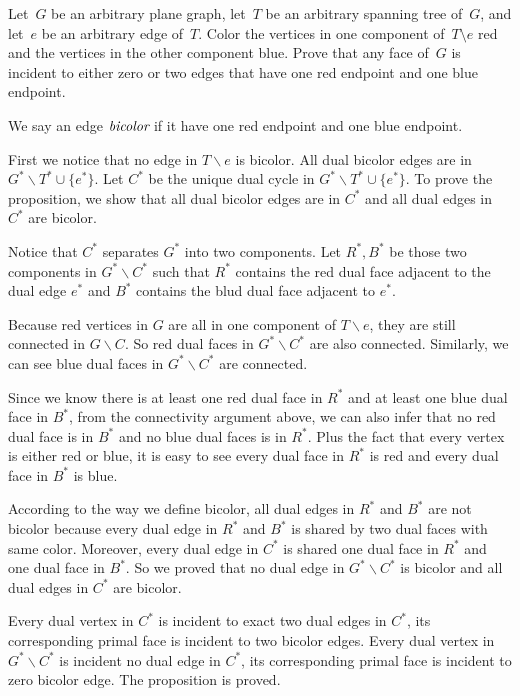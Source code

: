 \documentclass[11pt]{article}
\begin{document}
Let~\(G\) be an arbitrary plane graph, let~\(T\) be an arbitrary spanning tree of~\(G\), and
let~\(e\) be an arbitrary edge of~\(T\).
Color the vertices in one component of~\(T \setminus e\) red and the vertices in the other
component blue.
Prove that any face of~\(G\) is incident to either zero or two edges that have one red endpoint
and one blue endpoint.

\begin{solution}
  We say an edge \(\emph{bicolor}\) if it have one red endpoint and one blue endpoint.

  First we notice that no edge in \(T\backslash e\) is bicolor. All dual bicolor edges are in \(G^*\backslash T^* \cup \{e^*\}\).
  Let \(C^*\) be the unique dual cycle in \(G^*\backslash T^* \cup \{e^*\}\).
  To prove the proposition, we show that all dual bicolor edges are in \(C^*\) and all dual edges in \(C^*\) are bicolor.

  Notice that \(C^*\) separates \(G^*\) into two components.
  Let \(R^*,B^*\) be those two components in \(G^*\backslash C^*\) such that \(R^*\) contains the red dual face adjacent to the dual edge \(e^*\) and \(B^*\) contains the blud dual face adjacent to \(e^*\).

  Because red vertices in \(G\) are all in one component of \(T\backslash e\), they are still connected in \(G\backslash C\).
  So red dual faces in \(G^*\backslash C^*\) are also connected.
  Similarly, we can see blue dual faces in \(G^*\backslash C^*\) are connected.

  Since we know there is at least one red dual face in \(R^*\) and at least one blue dual face in \(B^*\), from the connectivity argument above, we can also infer that no red dual face is in \(B^*\) and no blue dual faces is in \(R^*\).
  Plus the fact that every vertex is either red or blue, it is easy to see every dual face in \(R^*\) is red and every dual face in \(B^*\) is blue.


  According to the way we define bicolor, all dual edges in \(R^*\) and \(B^*\) are not bicolor because every dual edge in \(R^*\) and \(B^*\) is shared by two dual faces with same color.
  Moreover, every dual edge in \(C^*\) is shared one dual face in \(R^*\) and one dual face in \(B^*\).
  So we proved that no dual edge in \(G^*\backslash C^*\) is bicolor and all dual edges in \(C^*\) are bicolor.

  Every dual vertex in \(C^*\) is incident to exact two dual edges in \(C^*\), its corresponding primal face is incident to two bicolor edges. Every dual vertex in \(G^*\backslash C^*\) is incident no dual edge in \(C^*\), its corresponding primal face is incident to zero bicolor edge. The proposition is proved.


\end{solution}
\end{document}
